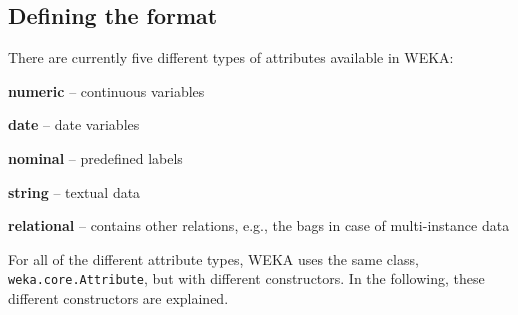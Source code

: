\subsection{Defining the format}
There are currently five different types of attributes available in WEKA:
\begin{tight_itemize}
	\item \textbf{numeric} -- continuous variables
	\item \textbf{date} -- date variables
	\item \textbf{nominal} -- predefined labels
	\item \textbf{string} -- textual data
	\item \textbf{relational} -- contains other relations, e.g., the bags in
case of multi-instance data
\end{tight_itemize}
For all of the different attribute types, WEKA uses the same class,
\texttt{weka.core.Attribute}, but with different constructors. In the
following, these different constructors are explained.
